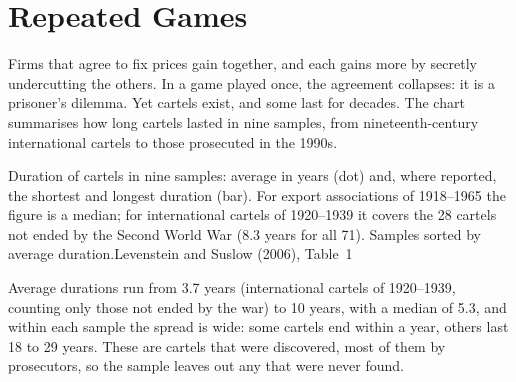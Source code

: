 \chapter{Repeated Games}\label{ch:b2:repeated-games}

Firms that agree to fix prices gain together, and each gains more by secretly undercutting the others. In a
game played once, the agreement collapses: it is a prisoner's dilemma. Yet cartels exist, and some last for
decades. The chart summarises how long cartels lasted in nine samples, from nineteenth-century
international cartels to those prosecuted in the 1990s.

\begin{openingchart}{Duration of cartels in nine samples: average in years (dot) and, where reported, the
  shortest and longest duration (bar). For export associations of 1918--1965 the figure is a median;
  for international cartels of 1920--1939 it covers the 28 cartels not ended by the Second World War (8.3 years
  for all 71). Samples sorted by average duration.}{Levenstein and Suslow (2006), Table~1}
\end{openingchart}

Average durations run from 3.7 years (international cartels of 1920--1939, counting only those not ended by the war) to
10 years, with a median of 5.3, and within each sample the spread is wide:
some cartels end within a year, others last 18 to 29 years. These are cartels that were discovered, most of
them by prosecutors, so the sample leaves out any that were never found.


